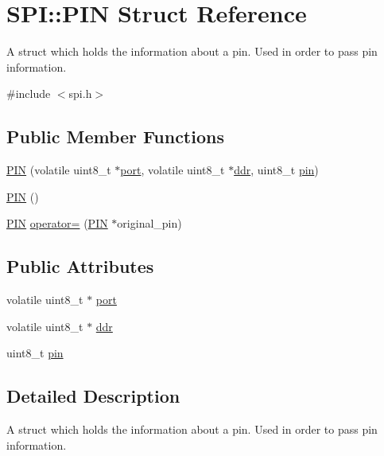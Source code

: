 \hypertarget{struct_s_p_i_1_1_p_i_n}{}\section{S\+PI\+:\+:P\+IN Struct Reference}
\label{struct_s_p_i_1_1_p_i_n}


A struct which holds the information about a pin. Used in order to pass pin information.  




{\ttfamily \#include $<$spi.\+h$>$}

\subsection*{Public Member Functions}
\begin{DoxyCompactItemize}
\item 
\hyperlink{struct_s_p_i_1_1_p_i_n_a5e05d742e74a6cce2d4adfc71861b9ff}{P\+IN} (volatile uint8\+\_\+t $\ast$\hyperlink{struct_s_p_i_1_1_p_i_n_a896a91638aa4958104d8a4db12757826}{port}, volatile uint8\+\_\+t $\ast$\hyperlink{struct_s_p_i_1_1_p_i_n_aa58f0c2ecb79cd6e1f8a6fea9623ee1e}{ddr}, uint8\+\_\+t \hyperlink{struct_s_p_i_1_1_p_i_n_a55bfa130253b589dc60b7a887c0fbfb4}{pin})
\item 
\hyperlink{struct_s_p_i_1_1_p_i_n_ab917cdeec465b7c72af8ef174cc5bca0}{P\+IN} ()
\item 
\hyperlink{struct_s_p_i_1_1_p_i_n}{P\+IN} \hyperlink{struct_s_p_i_1_1_p_i_n_adf85f2ca789d5de5ac6cf384242198a9}{operator=} (\hyperlink{struct_s_p_i_1_1_p_i_n}{P\+IN} $\ast$original\+\_\+pin)
\end{DoxyCompactItemize}
\subsection*{Public Attributes}
\begin{DoxyCompactItemize}
\item 
volatile uint8\+\_\+t $\ast$ \hyperlink{struct_s_p_i_1_1_p_i_n_a896a91638aa4958104d8a4db12757826}{port}
\item 
volatile uint8\+\_\+t $\ast$ \hyperlink{struct_s_p_i_1_1_p_i_n_aa58f0c2ecb79cd6e1f8a6fea9623ee1e}{ddr}
\item 
uint8\+\_\+t \hyperlink{struct_s_p_i_1_1_p_i_n_a55bfa130253b589dc60b7a887c0fbfb4}{pin}
\end{DoxyCompactItemize}


\subsection{Detailed Description}
A struct which holds the information about a pin. Used in order to pass pin information. 

